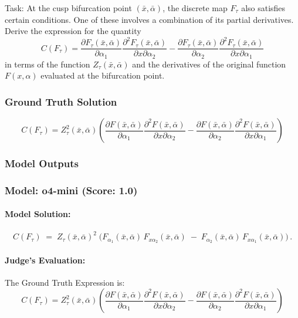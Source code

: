 \documentclass[10pt]{article}
\begin{document}
Task:
At the cusp bifurcation point $(\bar{x}, \bar{\alpha})$, the discrete map $F_\tau$ also satisfies certain conditions. One of these involves a combination of its partial derivatives. Derive the expression for the quantity
\begin{equation*}
C(F_\tau) = \frac{\partial F_{\tau}(\bar x, \bar \alpha)}{\partial \alpha_1}\frac{\partial^2 F_{\tau}(\bar x, \bar \alpha)}{\partial x\partial \alpha_2}-\frac{\partial F_{\tau}(\bar x, \bar \alpha)}{\partial \alpha _2}\frac{\partial^2 F_{\tau}(\bar x, \bar \alpha)}{\partial x\partial \alpha_1}
\end{equation*}
in terms of the function $Z_\tau(\bar{x}, \bar{\alpha})$ and the derivatives of the original function $F(x, \alpha)$ evaluated at the bifurcation point.

\subsubsection*{Ground Truth Solution}
\[ \boxed{\begin{equation*}
C(F_{\tau}) = Z_{\tau}^{2}(\bar x, \bar \alpha) \left( \frac{\partial F(\bar x, \bar \alpha)}{\partial \alpha_1}\frac{\partial^2 F(\bar x, \bar \alpha)}{\partial x\partial \alpha_2}-\frac{\partial F(\bar x, \bar \alpha)}{\partial \alpha_2}\frac{\partial^2 F(\bar x, \bar \alpha)}{\partial x\partial \alpha_1} \right)
\end{equation*}} \]

\subsubsection*{Model Outputs}
\subsubsection*{Model: o4-mini (Score: 1.0)}
\paragraph*{Model Solution:}
\[ C(F_\tau)
\;=\;
Z_\tau(\bar x,\bar\alpha)^2
\;\bigl(
F_{\alpha_1}(\bar x,\bar\alpha)\,F_{x\alpha_2}(\bar x,\bar\alpha)
\;-\;
F_{\alpha_2}(\bar x,\bar\alpha)\,F_{x\alpha_1}(\bar x,\bar\alpha)
\bigr)\,. \]

\paragraph*{Judge's Evaluation:}

The Ground Truth Expression is:
\[
C(F_{\tau}) = Z_{\tau}^{2}(\bar x, \bar \alpha) \left( \frac{\partial F(\bar x, \bar \alpha)}{\partial \alpha_1}\frac{\partial^2 F(\bar x, \bar \alpha)}{\partial x\partial \alpha_2}-\frac{\partial F(\bar x, \bar \alpha)}{\partial \alpha_2}\frac{\partial^2 F(\bar x, \bar \alpha)}{\partial x\partial \alpha_1} \right)
\]
\end{document}
